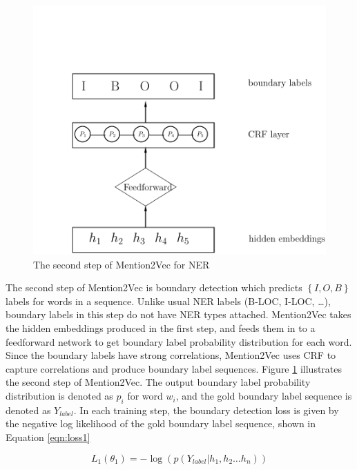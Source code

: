 \begin{figure}
  \centering
  \includegraphics[scale=0.6]{mention2vec2.pdf}
 \caption{The second step of Mention2Vec for NER}
  \label{fig:mention2vec2}
\end{figure}

The second step of Mention2Vec is boundary detection which predicts $\left\{I, O, B\right\}$ labels for words in a sequence. Unlike usual NER labels (B-LOC, I-LOC, \dots), boundary labels in this step do not have NER types attached. Mention2Vec takes the hidden embeddings produced in the first step, and feeds them in to a feedforward network to get boundary label probability distribution for each word. Since the boundary labels have strong correlations, Mention2Vec uses CRF to capture correlations and produce boundary label sequences. Figure \ref{fig:mention2vec2} illustrates the second step of Mention2Vec. The output boundary label probability distribution is denoted as $p_{i}$ for word $w_{i}$, and the gold boundary label sequence is denoted as $Y_{label}$. In each training step, the boundary detection loss is given by the negative log likelihood of the gold boundary label sequence, shown in Equation \ref{eqn:loss1}

\begin{equation}\label{eqn:loss1}
  L_{1}\left(\theta _{1}\right) =-\log \left( p\left( Y_{label}|h_{1}, h_{2} \dots h_{n}\right) \right) 
\end{equation}

